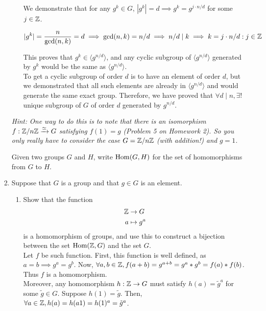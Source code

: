 \documentclass{amsart}
\begin{document}
\begin{enumerate}[itemsep=0.4in]
\begin{enumerate}
        We demonstrate that for any $g^k\in G$, $|g^k|=d\implies g^k=g^{j\cdot n/d}$ for some $j\in\mathbb{Z}$.

        $$|g^k|=\frac n{\gcd(n,k)}=d\implies \gcd(n,k)=n/d\implies n/d\mid k\implies k=j\cdot n/d:j\in\mathbb{Z}$$

        This proves that $g^k\in\langle g^{n/d}\rangle$, and any cyclic subgroup of $\langle g^{n/d}\rangle$ generated by $g^k$ would be the same as $\langle g^{n/d}\rangle$.\\

        To get a cyclic subgroup of order $d$ is to have an element of order $d$, but we demonstrated that all such elements are already in $\langle g^{n/d}\rangle$ and would generate the same exact group. Therefore, we have proved that $\forall d\mid n,\exists!$ unique subgroup of $G$ of order $d$ generated by $g^{n/d}$.
\end{enumerate}

\emph{Hint: One way to do this is to note that there is an isomorphism $f:\mathbb{Z}/n\mathbb{Z}\xrightarrow{\simeq}G$ satisfying $f(1) = g$ (Problem 5 on Homework 2). So you only really have to consider the case $G = \mathbb{Z}/n\mathbb{Z}$ (with addition!) and $g = 1$.}


\vspace{0.2in}
Given two groups $G$ and $H$, write $\operatorname{Hom}(G,H)$ for the set of homomorphisms from $G$ to $H$.


\item Suppose that $G$ is a group and that $g\in G$ is an element.
\begin{enumerate}
	\item Show that the function
	\begin{align*}
	\mathbb{Z}&\to G\\
	a&\mapsto g^a
	\end{align*}
	is a homomorphism of groups, and use this to construct a bijection between the set $\operatorname{Hom}(\mathbb{Z},G)$ and the set $G$.\\

        Let $f$ be such function. First, this function is well defined, as $a=b\implies g^a=g^b$. Now, $\forall a,b\in\mathbb{Z},f(a+b)=g^{a+b}=g^a*g^b=f(a)*f(b)$. Thus $f$ is a homomorphism.\\
        
        Moreover, any homomorphism $h:\mathbb{Z}\to G$ must satisfy $h(a)=\tilde{g}^a$ for some $\tilde g\in G$. Suppose $h(1)=\tilde g$. Then, $\forall a\in\mathbb{Z},h(a)=h(a1)=h(1)^a=\tilde g^a$.\\
        

\end{enumerate}
\end{enumerate}
\end{document}
